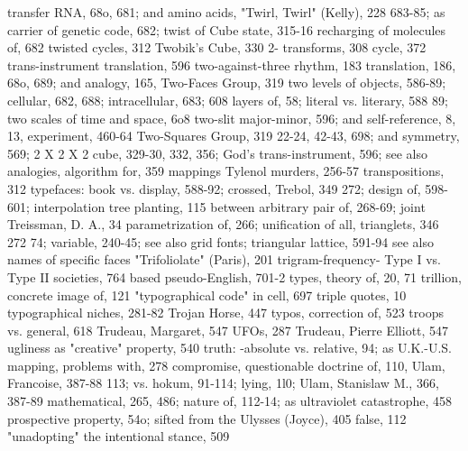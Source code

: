transfer RNA, 68o, 681; and amino acids,            "Twirl, Twirl" (Kelly), 228
  683-85; as carrier of genetic code, 682;          twist of Cube state, 315-16
  recharging of molecules of, 682                   twisted cycles, 312 Twobik's Cube, 330 2-
transforms, 308                                      cycle, 372
trans-instrument translation, 596                   two-against-three rhythm, 183
translation, 186, 68o, 689; and analogy, 165,       Two-Faces Group, 319 two levels of objects,
  586-89; cellular, 682, 688; intracellular, 683;    608
  layers of, 58; literal vs. literary, 588 89;      two scales of time and space, 6o8 two-slit
  major-minor, 596; and self-reference, 8, 13,       experiment, 460-64 Two-Squares Group, 319
  22-24, 42-43, 698; and symmetry, 569;             2 X 2 X 2 cube, 329-30, 332, 356; God's
  trans-instrument, 596; see also analogies,         algorithm for, 359
  mappings                                          Tylenol murders, 256-57
transpositions, 312                                 typefaces: book vs. display, 588-92; crossed,
Trebol, 349                                          272; design of, 598-601; interpolation
tree planting, 115                                   between arbitrary pair of, 268-69; joint
Treissman, D. A., 34                                 parametrization of, 266; unification of all,
trianglets, 346                                      272 74; variable, 240-45; see also grid fonts;
triangular lattice, 591-94                           see also names of specific faces
"Trifoliolate" (Paris), 201 trigram-frequency-      Type I vs. Type II societies, 764
  based pseudo-English, 701-2                       types, theory of, 20, 71
trillion, concrete image of, 121                    "typographical code" in cell, 697
triple quotes, 10                                   typographical niches, 281-82
Trojan Horse, 447                                   typos, correction of, 523
troops vs. general, 618
Trudeau, Margaret, 547                              UFOs, 287
Trudeau, Pierre Elliott, 547                        ugliness as "creative" property, 540
truth: -absolute vs. relative, 94; as               U.K.-U.S. mapping, problems with, 278
  compromise, questionable doctrine of, 110,        Ulam, Francoise, 387-88
  113; vs. hokum, 91-114; lying, 1l0;               Ulam, Stanislaw M., 366, 387-89
  mathematical, 265, 486; nature of, 112-14; as     ultraviolet catastrophe, 458
  prospective property, 54o; sifted from the        Ulysses (Joyce), 405
  false, 112                                        "unadopting" the intentional stance, 509
